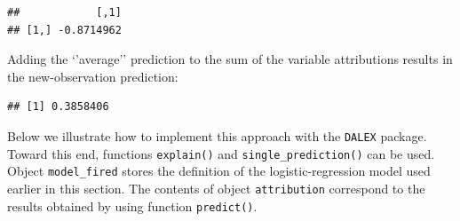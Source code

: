\documentclass[]{krantz}
\newenvironment{Shaded}{\begin{snugshade}}{\end{snugshade}}
\newcommand{\DataTypeTok}[1]{\textcolor[rgb]{0.13,0.29,0.53}{#1}}
\newcommand{\DecValTok}[1]{\textcolor[rgb]{0.00,0.00,0.81}{#1}}
\newcommand{\KeywordTok}[1]{\textcolor[rgb]{0.13,0.29,0.53}{\textbf{#1}}}
\newcommand{\NormalTok}[1]{#1}
\newcommand{\OperatorTok}[1]{\textcolor[rgb]{0.81,0.36,0.00}{\textbf{#1}}}
\newcommand{\StringTok}[1]{\textcolor[rgb]{0.31,0.60,0.02}{#1}}
\theoremstyle{definition}
\theoremstyle{definition}
\theoremstyle{definition}
\theoremstyle{remark}
\begin{document}
\begin{Shaded}
\end{Shaded}

\begin{verbatim}
##            [,1]
## [1,] -0.8714962
\end{verbatim}

Adding the `'average'' prediction to the sum of the variable
attributions results in the new-observation prediction:

\begin{Shaded}
\end{Shaded}

\begin{verbatim}
## [1] 0.3858406
\end{verbatim}

Below we illustrate how to implement this approach with the
\texttt{DALEX} package. Toward this end, functions \texttt{explain()}
and \texttt{single\_prediction()} can be used. Object
\texttt{model\_fired} stores the definition of the logistic-regression
model used earlier in this section. The contents of object
\texttt{attribution} correspond to the results obtained by using
function \texttt{predict()}.

\begin{Shaded}
\end{Shaded}
\end{document}
